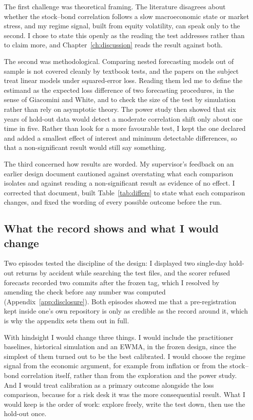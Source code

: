 The first challenge was theoretical framing. The literature disagrees about whether the stock--bond correlation follows a slow macroeconomic state or market stress, and my regime signal, built from equity volatility, can speak only to the second. I chose to state this openly as the reading the test addresses rather than to claim more, and Chapter~\ref{ch:discussion} reads the result against both.

The second was methodological. Comparing nested forecasting models out of sample is not covered cleanly by textbook tests, and the papers on the subject treat linear models under squared-error loss. Reading them led me to define the estimand as the expected loss difference of two forecasting procedures, in the sense of Giacomini and White, and to check the size of the test by simulation rather than rely on asymptotic theory. The power study then showed that six years of hold-out data would detect a moderate correlation shift only about one time in five. Rather than look for a more favourable test, I kept the one declared and added a smallest effect of interest and minimum detectable differences, so that a non-significant result would still say something.

The third concerned how results are worded. My supervisor's feedback on an earlier design document cautioned against overstating what each comparison isolates and against reading a non-significant result as evidence of no effect. I corrected that document, built Table~\ref{tab:differs} to state what each comparison changes, and fixed the wording of every possible outcome before the run.

\subsection{What the record shows and what I would change}\label{sec:refl-change}

Two episodes tested the discipline of the design: I displayed two single-day hold-out returns by accident while searching the test files, and the scorer refused forecasts recorded two commits after the frozen tag, which I resolved by amending the check before any number was computed (Appendix~\ref{app:disclosure}). Both episodes showed me that a pre-registration kept inside one's own repository is only as credible as the record around it, which is why the appendix sets them out in full.

With hindsight I would change three things. I would include the practitioner baselines, historical simulation and an EWMA, in the frozen design, since the simplest of them turned out to be the best calibrated. I would choose the regime signal from the economic argument, for example from inflation or from the stock--bond correlation itself, rather than from the exploration and the power study. And I would treat calibration as a primary outcome alongside the loss comparison, because for a risk desk it was the more consequential result. What I would keep is the order of work: explore freely, write the test down, then use the hold-out once.
